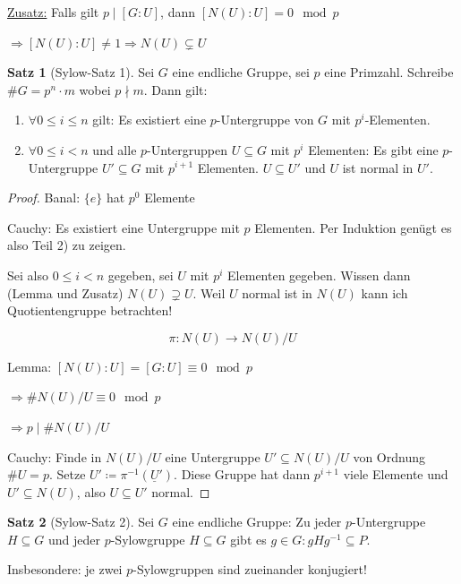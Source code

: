 \documentclass[12pt,parskip=full]{scrartcl}
\newcommand{\heading}{\underline}
\theoremstyle{definition}
\newtheorem{theorem}{Satz}[section]
\theoremstyle{remark}
\begin{document}
	\heading{Zusatz:} Falls gilt $p \mid [G:U]$, dann $[N(U):U] = 0 \mod p$
	
	$\Rightarrow [N(U):U] \neq 1 \Rightarrow N(U) \subsetneq U$
	
	\begin{theorem}[Sylow-Satz 1]
		Sei $G$ eine endliche Gruppe, sei $p$ eine Primzahl. Schreibe $\#G = p^n \cdot m$ wobei $p \nmid m$. Dann gilt:
		\begin{enumerate}
			\item $\forall 0 \leq i \leq n$ gilt: Es existiert eine $p$-Untergruppe von $G$ mit $p^i$-Elementen.
			\item $\forall 0 \leq i < n$ und alle $p$-Untergruppen $U \subseteq G$ mit $p^i$ Elementen: Es gibt eine $p$-Untergruppe $U' \subseteq G$ mit $p^{i+1}$ Elementen. $U \subseteq U'$ und $U$ ist normal in $U'$.
		\end{enumerate}
	\end{theorem}

	\begin{proof}
		Banal: $\{ e \}$ hat $p^0$ Elemente
		
		Cauchy: Es existiert eine Untergruppe mit $p$ Elementen. Per Induktion genügt es also Teil 2) zu zeigen.
		
		Sei also $0 \leq i < n$ gegeben, sei $U$ mit $p^i$ Elementen gegeben. Wissen dann (Lemma und Zusatz) $N(U) \supsetneq U$. Weil $U$ normal ist in $N(U)$ kann ich Quotientengruppe betrachten!
		
		\begin{equation*}
			\pi: N(U) \longrightarrow N(U) / U
		\end{equation*}
		
		Lemma: $[N(U):U] = [G: U] \equiv 0 \mod p$
		
		$\Rightarrow \# N(U)/U \equiv 0 \mod p$
		
		$\Rightarrow p \mid \# N(U)/U$
		
		Cauchy: Finde in $N(U)/U$ eine Untergruppe $U' \subseteq N(U)/U$ von Ordnung $\#U = p$. Setze $U' \coloneqq \pi^{-1} (\underline{U}')$. Diese Gruppe hat dann $p^{i+1}$ viele Elemente und $U' \subseteq N(U)$, also $U \subseteq U'$ normal.
	\end{proof}

	\begin{theorem}[Sylow-Satz 2]
		Sei $G$ eine endliche Gruppe: Zu jeder $p$-Untergruppe $H \subseteq G$ und jeder $p$-Sylowgruppe $H \subseteq G$ gibt es $g \in G: g H g^{-1} \subseteq P$.
		
		Insbesondere: je zwei $p$-Sylowgruppen sind zueinander konjugiert!
	\end{theorem}
\end{document}
